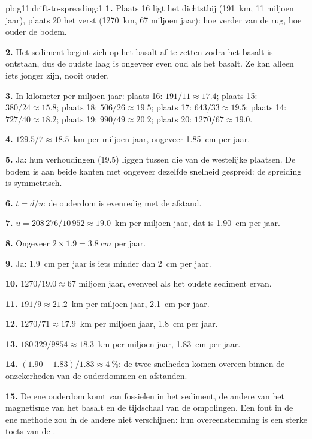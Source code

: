 \begin{solution}{pb:g11:drift-to-spreading:1}
\textbf{1.} Plaats 16 ligt het dichtstbij (\qty{191}{km}, 11 miljoen jaar),
plaats 20 het verst (\qty{1270}{km}, 67 miljoen jaar): hoe verder van de rug,
hoe ouder de bodem.

\textbf{2.} Het sediment begint zich op het basalt af te zetten zodra het basalt
is ontstaan, dus de oudste laag is ongeveer even oud als het basalt. Ze kan alleen
iets jonger zijn, nooit ouder.

\textbf{3.} In kilometer per miljoen jaar: plaats 16: $191/11 \approx 17.4$;
plaats 15: $380/24 \approx 15.8$; plaats 18: $506/26 \approx 19.5$; plaats 17:
$643/33 \approx 19.5$; plaats 14: $727/40 \approx 18.2$; plaats 19: $990/49
\approx 20.2$; plaats 20: $1270/67 \approx 19.0$.

\textbf{4.} $129.5/7 \approx \num{18.5}$~km per miljoen jaar, ongeveer
\qty{1.85}{cm} per jaar.

\textbf{5.} Ja: hun verhoudingen (19.5) liggen tussen die van de westelijke
plaatsen. De bodem is aan beide kanten met ongeveer dezelfde snelheid gespreid:
de spreiding is symmetrisch.

\textbf{6.} $t = d/u$: de ouderdom is evenredig met de afstand.

\textbf{7.} $u = 208\,276/10\,952 \approx \num{19.0}$~km per miljoen jaar,
dat is \qty{1.90}{cm} per jaar.

\textbf{8.} Ongeveer $2 \times 1.9 = \qty{3.8}{cm}$ per jaar.

\textbf{9.} Ja: \qty{1.9}{cm} per jaar is iets minder dan \qty{2}{cm} per
jaar.

\textbf{10.} $1270/19.0 \approx 67$ miljoen jaar, evenveel als het oudste
sediment ervan.

\textbf{11.} $191/9 \approx \num{21.2}$~km per miljoen jaar,
\qty{2.1}{cm} per jaar.

\textbf{12.} $1270/71 \approx \num{17.9}$~km per miljoen jaar,
\qty{1.8}{cm} per jaar.

\textbf{13.} $180\,329/9854 \approx \num{18.3}$~km per miljoen jaar,
\qty{1.83}{cm} per jaar.

\textbf{14.} $(1.90 - 1.83)/1.83 \approx \qty{4}{\percent}$: de twee snelheden
komen overeen binnen de onzekerheden van de ouderdommen en afstanden.

\textbf{15.} De ene ouderdom komt van fossielen in het sediment, de andere van het
magnetisme van het basalt en de tijdschaal van de ompolingen. Een fout in de ene
methode zou in de andere niet verschijnen: hun overeenstemming is een sterke toets
van de .


\end{solution}
